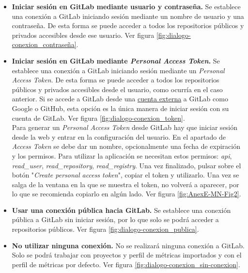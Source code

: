 \begin{itemize}
	\tightlist
	\item \textbf{Iniciar sesión en GitLab mediante usuario y contraseña.} Se establece una conexión a GitLab iniciando sesión mediante un nombre de usuario y una contraseña. De esta forma se puede acceder a todos los repositorios públicos y privados accesibles desde ese usuario. Ver figura \ref{fig:dialogo-conexion_contraseña}.
	\item \textbf{Iniciar sesión en GitLab mediante \textit{Personal Access Token}.} Se establece una conexión a GitLab iniciando sesión mediante un \textit{Personal Access Token}. De esta forma se puede acceder a todos los repositorios públicos y privados accesibles desde el usuario, como ocurría en el caso anterior. 
	Si se accede a GitLab desde una \underline{cuenta externa} a GitLab como Google o GitHub, esta opción es la única manera de iniciar sesión con su cuenta de GitLab. Ver figura \ref{fig:dialogo-conexion_token}.
	\\
	Para generar un \textit{Personal Access Token} desde GitLab hay que iniciar sesión desde la web y entrar en la configuración del usuario. En el apartado de \textit{Access Token} se debe dar un nombre, opcionalmente una fecha de expiración y los permisos. Para utilizar la aplicación se necesitan estos permisos: \textit{api}, \textit{read\_user}, \textit{read\_repository}, \textit{read\_registry}. Una vez finalizado, pulsar sobre el botón "\textit{Create personal access token}", copiar el token y utilizarlo. Una vez se salga de la ventana en la que se muestra el token, no volverá a aparecer, por lo que se recomienda copiarlo en algún lado. Ver figura \ref{fig:AnexE-MN-Fig2}.
	\item \textbf{Usar una conexión pública hacia GitLab.} Se establece una conexión pública a GitLab sin iniciar sesión, por lo que solo se podrá acceder a repositorios públicos. Ver figura \ref{fig:dialogo-conexion_publica}.
	\item \textbf{No utilizar ninguna conexión.} No se realizará ninguna conexión a GitLab. Solo se podrá trabajar con proyectos y perfil de métricas importados y con el perfil de métricas por defecto. Ver figura \ref{fig:dialogo-conexion_sin-conexion}.
\end{itemize}

